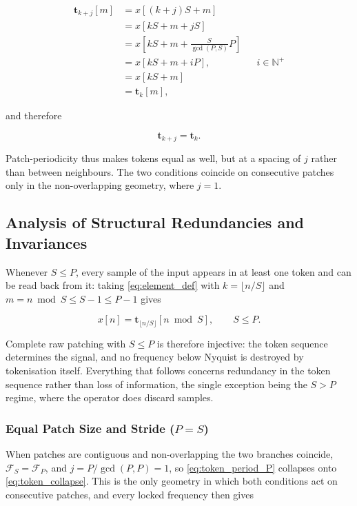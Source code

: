 \begin{equation*}
\begin{aligned}
\mathbf{t}_{k+j}[m]
&=
x[(k+j)S+m]
\\
&=
x[kS+m+jS]
\\
&=
x\!\left[kS+m+\frac{S}{\gcd(P,S)}P\right]
\\
&=
x[kS+m+iP],
&& i\in\mathbb{N}^{+}
\\
&=
x[kS+m]
\\
&=
\mathbf{t}_k[m],
\end{aligned}
\end{equation*}

and therefore

\begin{equation}
\label{eq:token_period_P}
\mathbf{t}_{k+j}
=
\mathbf{t}_k.
\end{equation}

Patch-periodicity thus makes tokens equal as well, but at a spacing of $j$ rather than between neighbours. The two conditions coincide on consecutive patches only in the non-overlapping geometry, where $j=1$.

\subsection{Analysis of Structural Redundancies and Invariances}

Whenever $S\le P$, every sample of the input appears in at least one token and can be read back from it: taking \autoref{eq:element_def} with $k=\lfloor n/S\rfloor$ and $m = n \bmod S \le S-1 \le P-1$ gives

\begin{equation}
\label{eq:reconstruction}
x[n]
=
\mathbf{t}_{\lfloor n/S\rfloor}\!\left[n \bmod S\right],
\qquad
S\le P.
\end{equation}

Complete raw patching with $S\le P$ is therefore injective: the token sequence determines the signal, and no frequency below Nyquist is destroyed by tokenisation itself. Everything that follows concerns redundancy in the token sequence rather than loss of information, the single exception being the $S>P$ regime, where the operator does discard samples.

\subsubsection*{Equal Patch Size and Stride ($P=S$)}
When patches are contiguous and non-overlapping the two branches coincide, $\mathcal{F}_{S}=\mathcal{F}_{P}$, and $j=P/\gcd(P,P)=1$, so \autoref{eq:token_period_P} collapses onto \autoref{eq:token_collapse}. This is the only geometry in which both conditions act on consecutive patches, and every locked frequency then gives

